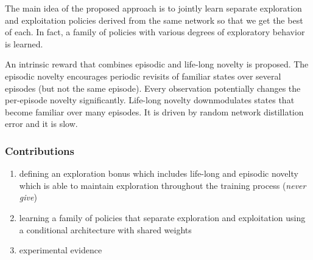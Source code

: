 \documentclass{article}
\begin{document}
The main idea of the proposed approach is to jointly learn separate exploration and exploitation policies
derived from the same network so that we get the best of each.
In fact, a family of policies with various degrees of exploratory behavior is learned.

An intrinsic reward that combines episodic and life-long novelty is proposed.
The episodic novelty encourages periodic revisits of familiar states over several episodes (but not the same episode).
Every observation potentially changes the per-episode novelty significantly.
Life-long novelty downmodulates states that become familiar over many episodes. It is driven
by random network distillation error and it is slow.


\subsubsection{Contributions}
\begin{enumerate}
		\item defining an exploration bonus which includes life-long and episodic novelty which is able to maintain exploration 
				throughout the training process (\textit{never give})
		\item learning a family of policies that separate exploration and exploitation using a conditional architecture with shared weights
		\item experimental evidence
\end{enumerate}
\end{document}
